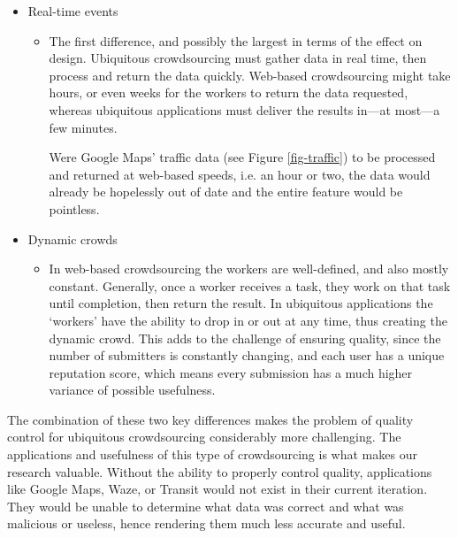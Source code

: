 \documentclass{sig-alternate-05-2015}
\begin{document}
	\begin{itemize}
		\item Real-time events
		\begin{itemize}
			\item The first difference, and possibly the largest in terms of the effect on design. Ubiquitous crowdsourcing must gather data in real time, then process and return the data quickly. Web-based crowdsourcing might take hours, or even weeks for the workers to return the data requested, whereas ubiquitous applications must deliver the results in---at most---a few minutes.
			
			Were  Google Maps' traffic data (see Figure \ref{fig-traffic}) to be processed and returned at web-based speeds, i.e. an hour or two, the data would already be hopelessly out of date and the entire feature would be pointless.
		\end{itemize}
		\item Dynamic crowds
		\begin{itemize}
			\item In web-based crowdsourcing the workers are well-defined, and also mostly constant. Generally, once a worker receives a task, they work on that task until completion, then return the result. In ubiquitous applications the `workers' have the ability to drop in or out at any time, thus creating the dynamic crowd. This adds to the challenge of ensuring quality, since the number of submitters is constantly changing, and each user has a unique reputation score, which means every submission has a much higher variance of possible usefulness.
		\end{itemize}
	\end{itemize}
	
	The combination of these two key differences makes the problem of quality control for ubiquitous crowdsourcing considerably more challenging. The applications and usefulness of this type of crowdsourcing is what makes our research valuable. Without the ability to properly control quality, applications like Google Maps, Waze, or Transit would not exist in their current iteration. They would be unable to determine what data was correct and what was malicious or useless, hence rendering them much less accurate and useful.
	
\end{document}
